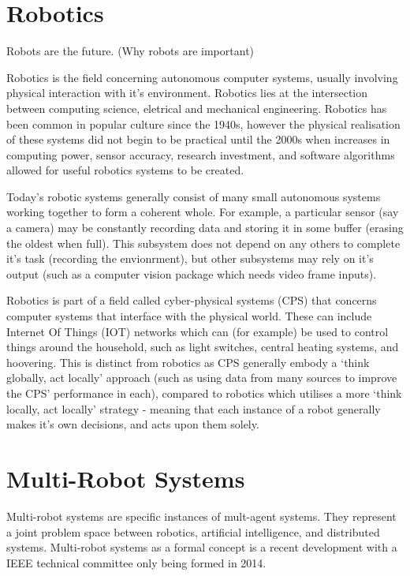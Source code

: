 \documentclass[../dissertation.tex]{subfiles}
\begin{document}
\section{Robotics}

Robots are the future. (Why robots are important)

Robotics is the field concerning autonomous computer systems, usually involving physical interaction with it's environment. Robotics lies at the intersection between computing science, eletrical and mechanical engineering. Robotics has been common in popular culture since the 1940s, however the physical realisation of these systems did not begin to be practical until the 2000s when increases in computing power, sensor accuracy, research investment, and software algorithms allowed for useful robotics systems to be created.

Today's robotic systems generally consist of many small autonomous systems working together to form a coherent whole. For example, a particular sensor (say a camera) may be constantly recording data and storing it in some buffer (erasing the oldest when full). This subsystem does not depend on any others to complete it's task (recording the envionrment), but other subsystems may rely on it's output (such as a computer vision package which needs video frame inputs).

Robotics is part of a field called cyber-physical systems (CPS) that concerns computer systems that interface with the physical world. These can include Internet Of Things (IOT) networks which can (for example) be used to control things around the household, such as light switches, central heating systems, and hoovering. This is distinct from robotics as CPS generally embody a `think globally, act locally' approach (such as using data from many sources to improve the CPS' performance in each), compared to robotics which utilises a more `think locally, act locally' strategy - meaning that each instance of a robot generally makes it's own decisions, and acts upon them solely.

\section{Multi-Robot Systems}

Multi-robot systems are specific instances of mult-agent systems. They represent a joint problem space between robotics, artificial intelligence, and distributed systems. Multi-robot systems as a formal concept is a recent development with a IEEE technical committee only being formed in 2014\cite{MultiRobotSystemsIEEECommittee}.
\end{document}
